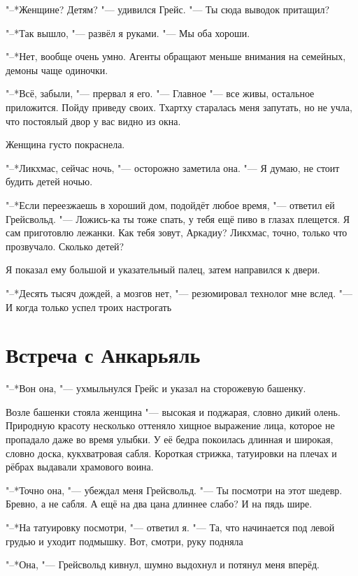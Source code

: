 \documentclass[a4paper,10pt,fleqn]{book}
\newcommand{\mulang}[3]{#2}%
\newcommand{\ldotst}{\so{...}\xspace}
\begin{document}
"--*Женщине?
Детям? "--- удивился Грейс.
"--- Ты сюда выводок притащил?

"--*Так вышло, "--- развёл я руками.
"--- Мы оба хороши.

"--*Нет, вообще очень умно.
Агенты обращают меньше внимания на семейных, демоны чаще одиночки.

"--*Всё, забыли, "--- прервал я его.
"--- Главное "--- все живы, остальное приложится.
Пойду приведу своих.
Тхартху старалась меня запутать, но не учла, что постоялый двор у вас видно из окна.

Женщина густо покраснела.

"--*Ликхмас, сейчас ночь, "--- осторожно заметила она.
"--- Я думаю, не стоит будить детей ночью.

"--*Если переезжаешь в хороший дом, подойдёт любое время, "--- ответил ей Грейсвольд.
"--- Ложись-ка ты тоже спать, у тебя ещё пиво в глазах плещется.
Я сам приготовлю лежанки.
Как тебя зовут, Аркадиу?
Ликхмас, точно, только что прозвучало.
Сколько детей?

Я показал ему большой и указательный палец, затем направился к двери.

\mulang{}{"--*Десять тысяч дождей, а мозгов нет, "--- резюмировал технолог мне вслед.}
{``Ten thousand rains, has got no brains,'' the technologist summed up to my back.}
"--- И когда только успел троих настрогать\ldotst

\section{Встреча с Анкарьяль}

"--*Вон она, "--- ухмыльнулся Грейс и указал на сторожевую башенку.

Возле башенки стояла женщина "--- высокая и поджарая, словно дикий олень.
Природную красоту несколько оттеняло хищное выражение лица, которое не пропадало даже во время улыбки.
У её бедра покоилась длинная и широкая, словно доска, кукхватровая сабля.
Короткая стрижка, татуировки на плечах и рёбрах выдавали храмового воина.

"--*Точно она, "--- убеждал меня Грейсвольд.
"--- Ты посмотри на этот шедевр.
Бревно, а не сабля.
А ещё на два цана длиннее слабо?
И на пядь шире.

"--*На татуировку посмотри, "--- ответил я.
"--- Та, что начинается под левой грудью и уходит подмышку.
Вот, смотри, руку подняла\ldotst

"--*Она, "--- Грейсвольд кивнул, шумно выдохнул и потянул меня вперёд.
\end{document}
